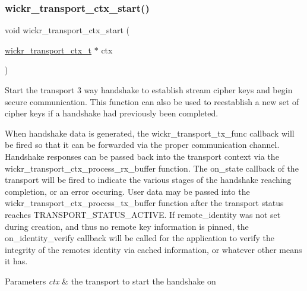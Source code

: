 \subsubsection{\texorpdfstring{wickr\+\_\+transport\+\_\+ctx\+\_\+start()}{wickr\_transport\_ctx\_start()}}
{\footnotesize\ttfamily void wickr\+\_\+transport\+\_\+ctx\+\_\+start (\begin{DoxyParamCaption}\item[{\hyperlink{structwickr__transport__ctx}{wickr\+\_\+transport\+\_\+ctx\+\_\+t} $\ast$}]{ctx }\end{DoxyParamCaption})}

Start the transport 3 way handshake to establish stream cipher keys and begin secure communication. This function can also be used to reestablish a new set of cipher keys if a handshake had previously been completed.

When handshake data is generated, the \textquotesingle{}wickr\+\_\+transport\+\_\+tx\+\_\+func\textquotesingle{} callback will be fired so that it can be forwarded via the proper communication channel. Handshake responses can be passed back into the transport context via the \textquotesingle{}wickr\+\_\+transport\+\_\+ctx\+\_\+process\+\_\+rx\+\_\+buffer\textquotesingle{} function. The \textquotesingle{}on\+\_\+state\textquotesingle{} callback of the transport will be fired to indicate the various stages of the handshake reaching completion, or an error occuring. User data may be passed into the \textquotesingle{}wickr\+\_\+transport\+\_\+ctx\+\_\+process\+\_\+tx\+\_\+buffer\textquotesingle{} function after the transport status reaches \textquotesingle{}T\+R\+A\+N\+S\+P\+O\+R\+T\+\_\+\+S\+T\+A\+T\+U\+S\+\_\+\+A\+C\+T\+I\+VE\textquotesingle{}. If \textquotesingle{}remote\+\_\+identity\textquotesingle{} was not set during creation, and thus no remote key information is pinned, the \textquotesingle{}on\+\_\+identity\+\_\+verify\textquotesingle{} callback will be called for the application to verify the integrity of the remote\textquotesingle{}s identity via cached information, or whatever other means it has.


\begin{DoxyParams}{Parameters}
{\em ctx} & the transport to start the handshake on \\
\hline
\end{DoxyParams}
